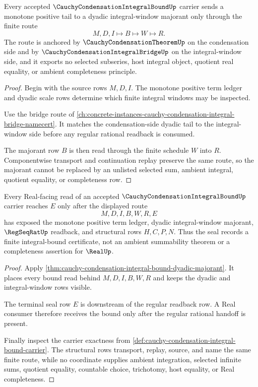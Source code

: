 \begin{theorem}
\label{thm:cauchy-condensation-integral-bound-dyadic-majorant}
Every accepted $\CauchyCondensationIntegralBoundUp$ carrier sends a monotone positive tail to a dyadic integral-window majorant only through the finite route
$$
M,D,I\longmapsto B\longmapsto W\longmapsto R.
$$
The route is anchored by $\CauchyCondensationTheoremUp$ on the condensation side and by $\CauchyCondensationIntegralBridgeUp$ on the integral-window side, and it exports no selected subseries, host integral object, quotient real equality, or ambient completeness principle.
\end{theorem}
\begin{proof}
Begin with the source rows $M,D,I$. The monotone positive term ledger and dyadic scale rows determine which finite integral windows may be inspected.

Use the bridge route of \autoref{ch:concrete-instances-cauchy-condensation-integral-bridge-namecert}. It matches the condensation-side dyadic tail to the integral-window side before any regular rational readback is consumed.

The majorant row $B$ is then read through the finite schedule $W$ into $R$. Componentwise transport and continuation replay preserve the same route, so the majorant cannot be replaced by an unlisted selected sum, ambient integral, quotient equality, or completeness row.
\end{proof}

\begin{theorem}
\label{thm:cauchy-condensation-integral-bound-real-seal}
Every Real-facing read of an accepted $\CauchyCondensationIntegralBoundUp$ carrier reaches $E$ only after the displayed route
$$
M,D,I,B,W,R,E
$$
has exposed the monotone positive term ledger, dyadic integral-window majorant, $\RegSeqRatUp$ readback, and structural rows $H,C,P,N$. Thus the seal records a finite integral-bound certificate, not an ambient summability theorem or a completeness assertion for $\RealUp$.
\end{theorem}
\begin{proof}
Apply \autoref{thm:cauchy-condensation-integral-bound-dyadic-majorant}. It places every bound read behind $M,D,I,B,W,R$ and keeps the dyadic and integral-window rows visible.

The terminal seal row $E$ is downstream of the regular readback row. A Real consumer therefore receives the bound only after the regular rational handoff is present.

Finally inspect the carrier exactness from \autoref{def:cauchy-condensation-integral-bound-carrier}. The structural rows transport, replay, source, and name the same finite route, while no coordinate supplies ambient integration, selected infinite sums, quotient equality, countable choice, trichotomy, host equality, or Real completeness.
\end{proof}

